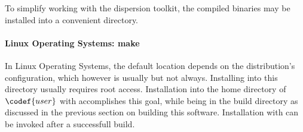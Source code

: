 
To simplify working with the dispersion toolkit, the compiled binaries may be installed into a convenient directory. 

\paragraph{Linux Operating Systems: make}

In Linux Operating Systems, the default location depends on the distribution's configuration, which however is usually
but not always. Installing into this directory usually requires root access. Installation into the home directory of $\codef{user}$ with
accomplishes this goal, while being in the build directory as discussed in the previous section on building this software. Installation with
can be invoked after a successfull build.

